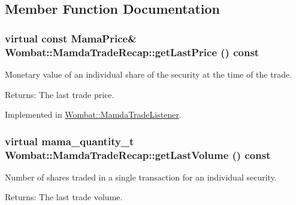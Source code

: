 \subsection{Member Function Documentation}
\hypertarget{classWombat_1_1MamdaTradeRecap_24a18014e43ec6df41a6405e3b2e0b03}{
\subsubsection[getLastPrice]{\setlength{\rightskip}{0pt plus 5cm}virtual const Mama\-Price\& Wombat::Mamda\-Trade\-Recap::get\-Last\-Price () const}}
\label{classWombat_1_1MamdaTradeRecap_24a18014e43ec6df41a6405e3b2e0b03}


Monetary value of an individual share of the security at the time of the trade. 

\begin{Desc}
\item[Returns:]The last trade price. \end{Desc}


Implemented in \hyperlink{classWombat_1_1MamdaTradeListener_71cbfa975acf8586bd072615f32337ff}{Wombat::Mamda\-Trade\-Listener}.\hypertarget{classWombat_1_1MamdaTradeRecap_095f2490ee5cb36624d26e34bf01547b}{
\subsubsection[getLastVolume]{\setlength{\rightskip}{0pt plus 5cm}virtual mama\_\-quantity\_\-t Wombat::Mamda\-Trade\-Recap::get\-Last\-Volume () const}}
\label{classWombat_1_1MamdaTradeRecap_095f2490ee5cb36624d26e34bf01547b}


Number of shares traded in a single transaction for an individual security. 

\begin{Desc}
\item[Returns:]The last trade volume. \end{Desc}


